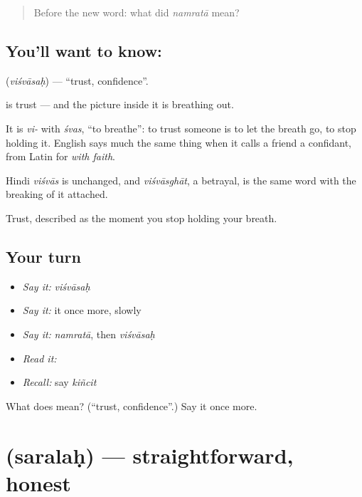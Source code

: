 \begin{quote}
Before the new word: what did \emph{namratā} mean?
\end{quote}

\subsection*{You'll want to know: }
\textbf{} (\emph{viśvāsaḥ}) — \textquotedblleft{}trust, confidence\textquotedblright{}.

\textbf{} is trust — and the picture inside it is breathing out.

It is \emph{vi-} with \emph{śvas}, \textquotedblleft{}to breathe\textquotedblright{}: to trust someone is to let the breath go, to stop holding it. English says much the same thing when it calls a friend a confidant, from Latin for \emph{with faith}.

Hindi \emph{viśvās} is unchanged, and \emph{viśvāsghāt}, a betrayal, is the same word with the breaking of it attached.

\begin{grammarlens}[title={What you've built}]
Trust, described as the moment you stop holding your breath.
\end{grammarlens}

\subsection*{Your turn}
\begin{itemize}
\raggedright
  \item \emph{Say it:} \emph{viśvāsaḥ}
  \item \emph{Say it:} it once more, slowly
  \item \emph{Say it:} \emph{namratā}, then \emph{viśvāsaḥ}
  \item \emph{Read it:} \textbf{}
  \item \emph{Recall:} say \emph{kiñcit}
\end{itemize}

\begin{tcolorbox}[breakable,colback=teal!4,colframe=teal!35!black,title={Before you move on}]
What does  mean? (\textquotedblleft{}trust, confidence\textquotedblright{}.) Say it once more.
\end{tcolorbox}
\section[\texorpdfstring{\sk{सरलः} (saralaḥ)}{सरलः (saralaḥ)}]{ (saralaḥ) — straightforward, honest}

